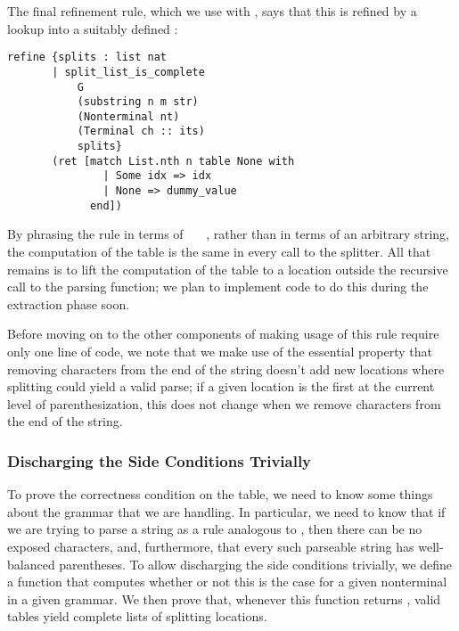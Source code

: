     The final refinement rule, which we use with , says that this is refined by a lookup into a suitably defined :
\begin{verbatim}
refine {splits : list nat
       | split_list_is_complete
           G
           (substring n m str)
           (Nonterminal nt)
           (Terminal ch :: its)
           splits}
       (ret [match List.nth n table None with
               | Some idx => idx
               | None => dummy_value
             end])
\end{verbatim}

    By phrasing the rule in terms of ~~~, rather than in terms of an arbitrary string, the computation of the table is the same in every call to the splitter.  All that remains is to lift the computation of the table to a location outside the recursive call to the parsing function; we plan to implement code to do this during the extraction phase soon.\label{sec:must-lift-table-mention}
    
    Before moving on to the other components of making usage of this rule require only one line of code, we note that we make use of the essential property that removing characters from the end of the string doesn't add new locations where splitting could yield a valid parse; if a given location is the first \terminal{+} at the current level of parenthesization, this does not change when we remove characters from the end of the string.
    
  \subsubsection{Discharging the Side Conditions Trivially}
    To prove the correctness condition on the table, we need to know some things about the grammar that we are handling.  In particular, we need to know that if we are trying to parse a string as a rule analogous to , then there can be no exposed \terminal{+} characters, and, furthermore, that every such parseable string has well-balanced parentheses.  To allow discharging the side conditions trivially, we define a function that computes whether or not this is the case for a given nonterminal in a given grammar.  We then prove that, whenever this function returns \true, valid tables yield complete lists of splitting locations.
    
